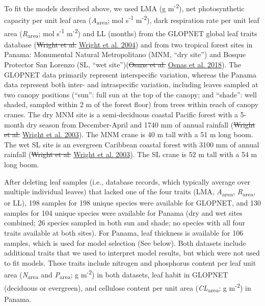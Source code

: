 \documentclass[
  12pt,
]{article}
\providecommand{\DIFdeltex}[1]{{\protect\color{red}\sout{#1}}}                      %
\providecommand{\DIFaddbegin}{} %
\providecommand{\DIFaddend}{} %
\providecommand{\DIFdelbegin}{} %
\providecommand{\DIFdelend}{} %
\providecommand{\DIFdel}[1]{\texorpdfstring{\DIFdeltex{#1}}{}} %
\newcommand{\DIFscaledelfig}{0.5}
\newlength{\DIFdelgraphicswidth} %
\newlength{\DIFdelgraphicsheight} %
\newcommand{\DIFaddincludegraphics}[2][]{{\color{blue}\fbox{\DIFOincludegraphics[#1]{#2}}}} %
\newcommand{\DIFdelincludegraphics}[2][]{%
\sbox{\DIFdelgraphicsbox}{\DIFOincludegraphics[#1]{#2}}%
\settoboxwidth{\DIFdelgraphicswidth}{\DIFdelgraphicsbox} %
\settoboxtotalheight{\DIFdelgraphicsheight}{\DIFdelgraphicsbox} %
\scalebox{\DIFscaledelfig}{%
\parbox[b]{\DIFdelgraphicswidth}{\usebox{\DIFdelgraphicsbox}\\[-\baselineskip] \rule{\DIFdelgraphicswidth}{0em}}\llap{\resizebox{\DIFdelgraphicswidth}{\DIFdelgraphicsheight}{%
\setlength{\unitlength}{\DIFdelgraphicswidth}%
\begin{picture}(1,1)%
\thicklines\linethickness{2pt} %
{\color[rgb]{1,0,0}\put(0,0){\framebox(1,1){}}}%
{\color[rgb]{1,0,0}\put(0,0){\line( 1,1){1}}}%
{\color[rgb]{1,0,0}\put(0,1){\line(1,-1){1}}}%
\end{picture}%
}\hspace*{3pt}}} %
} %
\DeclareRobustCommand{\DIFaddbegin}{\DIFOaddbegin \let\includegraphics\DIFaddincludegraphics} %
\DeclareRobustCommand{\DIFaddend}{\DIFOaddend \let\includegraphics\DIFOincludegraphics} %
\DeclareRobustCommand{\DIFdelbegin}{\DIFOdelbegin \let\includegraphics\DIFdelincludegraphics} %
\DeclareRobustCommand{\DIFdelend}{\DIFOaddend \let\includegraphics\DIFOincludegraphics} %
\begin{document}
To fit the models described above, we used LMA (g m\textsuperscript{-2}), net photosynthetic capacity per unit leaf area (\emph{A}\textsubscript{area}; mol s\textsuperscript{-1} m\textsuperscript{-2}), dark respiration rate per unit leaf area (\emph{R}\textsubscript{area}; mol s\textsuperscript{-1} m\textsuperscript{-2}) and LL (months) from the GLOPNET global leaf traits database (\DIFdelbegin \DIFdel{Wright et al. }\DIFdelend \protect\DIFdelbegin %
\DIFdelend \DIFaddbegin \hyperlink{ref-Wright2004a}{Wright et al. 2004}\DIFaddend ) and from two tropical forest sites in Panama: Monumental Natural Metropolitano (MNM, ``dry site'') and Bosque Protector San Lorenzo (SL, ``wet site'')(\DIFdelbegin \DIFdel{Osnas et al. }\DIFdelend \protect\DIFdelbegin %
\DIFdelend \DIFaddbegin \hyperlink{ref-Osnas2018}{Osnas et al. 2018}\DIFaddend ).
The GLOPNET data primarily represent interspecific variation, whereas the Panama data represent both inter- and intraspecific variation, including leaves sampled at two canopy positions (``sun'': full sun at the top of the canopy; and ``shade'': well shaded, sampled within 2 m of the forest floor) from trees within reach of canopy cranes.
The dry MNM site is a semi-deciduous coastal Pacific forest with a 5-month dry season from December-April and 1740 mm of annual rainfall (\DIFdelbegin \DIFdel{Wright et al. }\DIFdelend \protect\DIFdelbegin %
\DIFdelend \DIFaddbegin \hyperlink{ref-Wright2003}{Wright et al. 2003}\DIFaddend ).
The MNM crane is 40 m tall with a 51 m long boom. The wet SL site is an evergreen Caribbean coastal forest with 3100 mm of annual rainfall (\DIFdelbegin \DIFdel{Wright et al. }\DIFdelend \protect\DIFdelbegin %
\DIFdelend \DIFaddbegin \hyperlink{ref-Wright2003}{Wright et al. 2003}\DIFaddend ). The SL crane is 52 m tall with a 54 m long boom.

After deleting leaf samples (i.e., database records, which typically average over multiple individual leaves) that lacked one of the four traits (LMA, \emph{A}\textsubscript{area}, \emph{R}\textsubscript{area}, or LL), 198 samples for 198 unique species were available for GLOPNET, and 130 samples for 104 unique species were available for Panama (dry and wet sites combined; 26 species sampled in both sun and shade; no species with all four traits available at both sites).
For Panama, leaf thickness is available for 106 samples, which is used for model selection (See below).
Both datasets include additional traits that we used to interpret model results, but which were not used to fit models. These traits include nitrogen and phosphorus content per leaf unit area (\emph{N}\textsubscript{area} and \emph{P}\textsubscript{area}; g m\textsuperscript{-2}) in both datasets, leaf habit in GLOPNET (deciduous or evergreen), and cellulose content per unit area (\emph{CL}\textsubscript{area}; g m\textsuperscript{-2}) in Panama.
\end{document}
